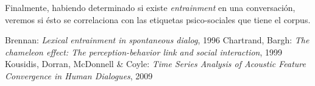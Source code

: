 \documentclass[a4paper,11pt]{article}
\begin{document}
Finalmente, habiendo determinado si existe \emph{entrainment} en una conversación, veremos si ésto se correlaciona con las etiquetas psico-sociales que tiene el corpus.



\begin{thebibliography}{9}
    Brennan:
    \emph{Lexical entrainment in spontaneous dialog},
    1996
    Chartrand, Bargh:
    \emph{The chameleon effect: The perception-behavior link and social interaction},
    1999
    Kousidis, Dorran, McDonnell \& Coyle:
    \emph{Time Series Analysis of Acoustic Feature Convergence in Human Dialogues},
    2009
\end{thebibliography}
\end{document}
